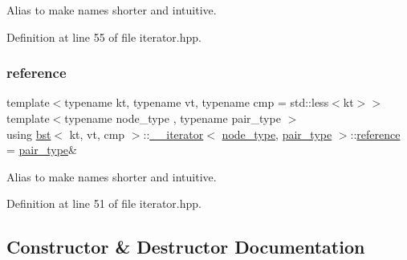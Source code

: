 Alias to make names shorter and intuitive. 

Definition at line 55 of file iterator.\+hpp.

\mbox{\label{classbst_1_1____iterator_a3189983e4edb73a8ce449b290ceb97d1}} 
\subsubsection{\texorpdfstring{reference}{reference}}
{\footnotesize\ttfamily template$<$typename kt, typename vt, typename cmp = std\+::less$<$kt$>$$>$ \\
template$<$typename node\+\_\+type , typename pair\+\_\+type $>$ \\
using \hyperlink{classbst}{bst}$<$ kt, vt, cmp $>$\+::\hyperlink{classbst_1_1____iterator}{\+\_\+\+\_\+iterator}$<$ \hyperlink{classbst_a062eb2a1ac54802dbc4f0f74ae2afd01}{node\+\_\+type}, \hyperlink{classbst_a7b11cca2a3b4394915600194f741ab16}{pair\+\_\+type} $>$\+::\hyperlink{classbst_1_1____iterator_a3189983e4edb73a8ce449b290ceb97d1}{reference} =  \hyperlink{classbst_a7b11cca2a3b4394915600194f741ab16}{pair\+\_\+type}\&}

Alias to make names shorter and intuitive. 

Definition at line 51 of file iterator.\+hpp.



\subsection{Constructor \& Destructor Documentation}
\mbox{\label{classbst_1_1____iterator_a0fabfd3d99d7c15da13123229a4cbede}} 
